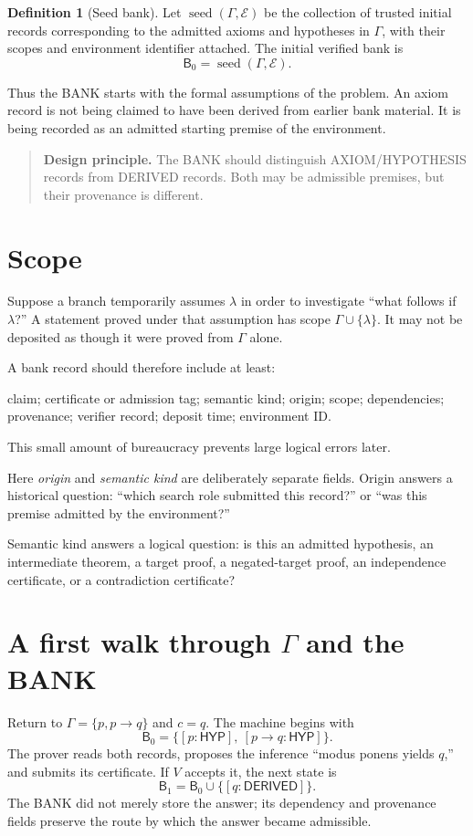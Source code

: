 \documentclass[11pt,openany]{book}
\theoremstyle{definition}
\newtheorem{definition}[theorem]{Definition}
\theoremstyle{remark}
\newenvironment{designbox}{\begin{quote}\small\color{green!35!black}\textbf{Design principle.} }{\end{quote}}
\newcommand{\Bank}{\mathsf{B}}
\newcommand{\Env}{\mathcal{E}}
\begin{document}
\begin{definition}[Seed bank]
Let $\operatorname{seed}(\Gamma,\Env)$ be the collection of trusted initial records corresponding to the admitted axioms and hypotheses in $\Gamma$, with their scopes and environment identifier attached. The initial verified bank is
\[
\Bank_0=\operatorname{seed}(\Gamma,\Env).
\]
\end{definition}
Thus the BANK starts with the formal assumptions of the problem. An axiom record is not being claimed to have been derived from earlier bank material. It is being recorded as an admitted starting premise of the environment.

\begin{designbox}
The BANK should distinguish \textsf{AXIOM/HYPOTHESIS} records from \textsf{DERIVED} records. Both may be admissible premises, but their provenance is different.
\end{designbox}

\section{Scope}
Suppose a branch temporarily assumes $\lambda$ in order to investigate ``what follows if $\lambda$?'' A statement proved under that assumption has scope $\Gamma\cup\{\lambda\}$. It may not be deposited as though it were proved from $\Gamma$ alone.

A bank record should therefore include at least:
\begin{center}
claim; certificate or admission tag; semantic kind; origin; scope; dependencies; provenance; verifier record; deposit time; environment ID.
\end{center}
This small amount of bureaucracy prevents large logical errors later.

Here \emph{origin} and \emph{semantic kind} are deliberately separate fields. Origin answers a historical question: ``which search role submitted this record?'' or ``was this premise admitted by the environment?''\par
Semantic kind answers a logical question: is this an admitted hypothesis, an intermediate theorem, a target proof, a negated-target proof, an independence certificate, or a contradiction certificate?

\section{A first walk through \texorpdfstring{$\Gamma$}{Gamma} and the BANK}
Return to $\Gamma=\{p,p\to q\}$ and $c=q$. The machine begins with
\[
\Bank_0=\{[p:\textsf{HYP}],\ [p\to q:\textsf{HYP}]\}.
\]
The prover reads both records, proposes the inference ``modus ponens yields $q$,'' and submits its certificate. If $V$ accepts it, the next state is
\[
\Bank_1=\Bank_0\cup\{[q:\textsf{DERIVED}]\}.
\]
The BANK did not merely store the answer; its dependency and provenance fields preserve the route by which the answer became admissible.
\end{document}

